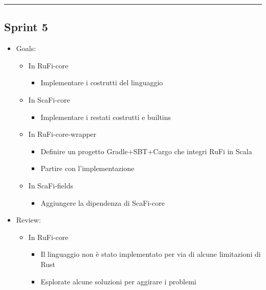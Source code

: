 \documentclass[12pt, a4paper]{article}
\begin{document}
\par\noindent\rule{\textwidth}{0.5pt}

\subsection*{Sprint 5}

\begin{itemize}
    \item Goals:
          \begin{itemize}
              \item In RuFi-core
                    \begin{itemize}
                        \item Implementare i costrutti del linguaggio
                    \end{itemize}
              \item In ScaFi-core
                    \begin{itemize}
                        \item Implementare i restati costrutti e builtins
                    \end{itemize}
              \item In RuFi-core-wrapper
                    \begin{itemize}
                        \item Definire un progetto Gradle+SBT+Cargo che integri RuFi in Scala
                        \item Partire con l'implementazione
                    \end{itemize}
              \item In ScaFi-fields
                    \begin{itemize}
                        \item Aggiungere la dipendenza di ScaFi-core
                    \end{itemize}
          \end{itemize}
    \item Review:
          \begin{itemize}
              \item In RuFi-core
                    \begin{itemize}
                        \item Il linguaggio non è stato implementato per via di alcune limitazioni di Rust
                        \item Esplorate alcune soluzioni per aggirare i problemi
                    \end{itemize}

\end{itemize}
\end{itemize}
\end{document}
